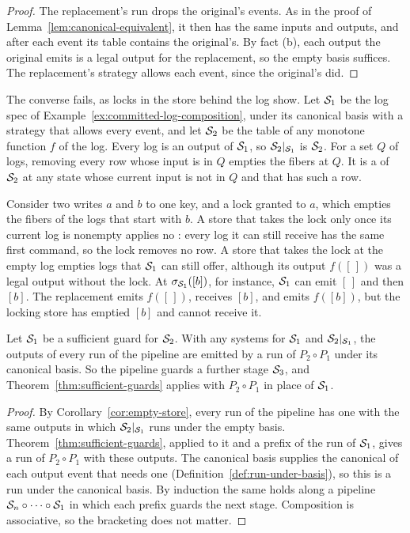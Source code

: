 \begin{proof}
The replacement's run drops the original's \commitment events.  As in the
proof of Lemma~\ref{lem:canonical-equivalent}, it then has the same inputs and
outputs, and after each event its table contains the original's.  By fact
(b), each output the original emits is a legal output for the replacement, so
the empty basis suffices.  The replacement's strategy allows each event,
since the original's did.
\end{proof}

The converse fails, as locks in the store behind the log show.  Let
$\mathcal{S}_1$ be the log spec of Example~\ref{ex:committed-log-composition}, under
its canonical basis with a strategy that allows every event, and let
$\mathcal{S}_2$ be the table of any monotone function $f$ of the log.  Every log is
an output of $\mathcal{S}_1$, so $\mathcal{S}_2|_{\mathcal{S}_1}$ is $\mathcal{S}_2$.  For a set $Q$
of logs, removing every row whose input is in $Q$ empties the fibers at $Q$.
It is a \commitment of $\mathcal{S}_2$ at any state whose current input is not in
$Q$ and that has such a row.

Consider two writes $a$ and $b$ to one key, and a lock granted to $a$, which
empties the fibers of the logs that start with $b$.  A store that takes the
lock only once its current log is nonempty applies no \commitment: every log
it can still receive has the same first command, so the lock removes no row.
A store that takes the lock at the empty log empties logs that $\mathcal{S}_1$ can
still offer, although its output $f([\,])$ was a legal output without the
lock.  At $\sigma_{\mathcal{S}_1}([b])$, for instance, $\mathcal{S}_1$ can emit $[\,]$ and
then $[b]$.  The replacement emits $f([\,])$, receives $[b]$, and emits
$f([b])$, but the locking store has emptied $[b]$ and cannot receive it.

\begin{corollary}[Pipelines]
\label{cor:pipelines}
Let $\mathcal{S}_1$ be a sufficient guard for $\mathcal{S}_2$.  With any systems for $\mathcal{S}_1$ and
$\mathcal{S}_2|_{\mathcal{S}_1}$, the outputs of every run of the pipeline are emitted by
a run of $P_2\circ P_1$ under its canonical basis.  So the pipeline guards a
further stage $\mathcal{S}_3$, and Theorem~\ref{thm:sufficient-guards} applies
with $P_2\circ P_1$ in place of $\mathcal{S}_1$.
\end{corollary}

\begin{proof}
By Corollary~\ref{cor:empty-store}, every run of the pipeline has one with the
same outputs in which $\mathcal{S}_2|_{\mathcal{S}_1}$ runs under the empty basis.
Theorem~\ref{thm:sufficient-guards}, applied to it and a prefix of the
run of $\mathcal{S}_1$, gives a run of $P_2\circ P_1$ with these outputs.  The
canonical basis supplies the canonical \commitment of each output event that
needs one (Definition~\ref{def:run-under-basis}), so this is a run under the
canonical basis.  By induction the same holds along a pipeline
$\mathcal{S}_n\circ\cdots\circ\mathcal{S}_1$ in which each prefix guards the next
stage.  Composition is associative, so the bracketing does not matter.
\end{proof}

